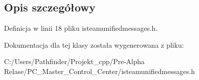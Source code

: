 \subsection{Opis szczegółowy}


Definicja w linii 18 pliku isteamunifiedmessages.\+h.



Dokumentacja dla tej klasy została wygenerowana z pliku\+:\begin{DoxyCompactItemize}
\item 
C\+:/\+Users/\+Pathfinder/\+Projekt\+\_\+cpp/\+Pre-\/\+Alpha Relase/\+P\+C\+\_\+\+Master\+\_\+\+Control\+\_\+\+Center/isteamunifiedmessages.\+h\end{DoxyCompactItemize}
